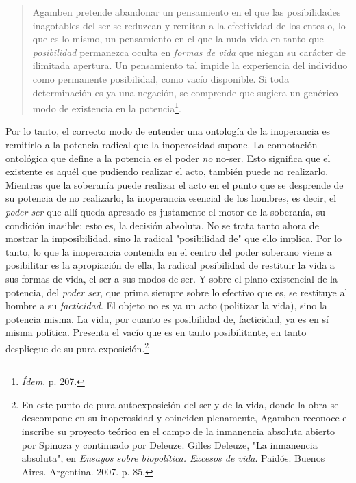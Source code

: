 \begin{quote}
Agamben pretende abandonar un pensamiento en el que las posibilidades
inagotables del ser se reduzcan y remitan a la efectividad de los entes
o, lo que es lo mismo, un pensamiento en el que la nuda vida en tanto
que \emph{posibilidad} permanezca oculta en \emph{formas de vida} que
niegan su carácter de ilimitada apertura. Un pensamiento tal impide la
experiencia del individuo como permanente posibilidad, como vacío
disponible. Si toda determinación es ya una negación, se comprende que
sugiera un genérico modo de existencia en la potencia\footnote{\emph{Ídem}.
  p. 207.}.
\end{quote}

Por lo tanto, el correcto modo de entender una ontología de la
inoperancia es remitirlo a la potencia radical que la inoperosidad
supone. La connotación ontológica que define a la potencia es el poder
\emph{no} no-ser. Esto significa que el existente es aquél que pudiendo
realizar el acto, también puede no realizarlo. Mientras que la soberanía
puede realizar el acto en el punto que se desprende de su potencia de no
realizarlo, la inoperancia esencial de los hombres, es decir, el
\emph{poder ser} que allí queda apresado es justamente el motor de la
soberanía, su condición inasible: esto es, la decisión absoluta. No se
trata tanto ahora de mostrar la imposibilidad, sino la radical
"posibilidad de" que ello implica. Por lo tanto, lo que la inoperancia
contenida en el centro del poder soberano viene a posibilitar es la
apropiación de ella, la radical posibilidad de restituir la vida a sus
formas de vida, el ser a sus modos de ser. Y sobre el plano existencial
de la potencia, del \emph{poder ser}, que prima siempre sobre lo
efectivo que es, se restituye al hombre a su \emph{facticidad}. El
objeto no es ya un acto (politizar la vida), sino la potencia misma. La
vida, por cuanto es posibilidad de, facticidad, ya es en sí misma
política. Presenta el vacío que es en tanto posibilitante, en tanto
despliegue de su pura exposición.\footnote{En este punto de pura
  autoexposición del ser y de la vida, donde la obra se descompone en su
  inoperosidad y coinciden plenamente, Agamben reconoce e inscribe su
  proyecto teórico en el campo de la inmanencia absoluta abierto por
  Spinoza y continuado por Deleuze. Gilles Deleuze, "La inmanencia
  absoluta", en \emph{Ensayos sobre biopolítica. Excesos de vida}.
  Paidós. Buenos Aires. Argentina. 2007. p. 85.}

